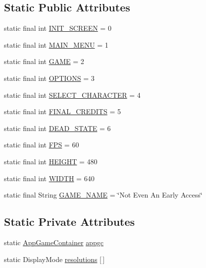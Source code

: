 \subsection*{Static Public Attributes}
\begin{DoxyCompactItemize}
\item 
static final int \mbox{\hyperlink{classstates_1_1_not_even_an_early_access_ac99102ff69eb50a2ab5e5179e9b0e051}{I\+N\+I\+T\+\_\+\+S\+C\+R\+E\+EN}} = 0
\item 
static final int \mbox{\hyperlink{classstates_1_1_not_even_an_early_access_a5d36ea9f3991d1e416da183a531c0f3f}{M\+A\+I\+N\+\_\+\+M\+E\+NU}} = 1
\item 
static final int \mbox{\hyperlink{classstates_1_1_not_even_an_early_access_ac1f4023cea8923ad519c090f6ba47274}{G\+A\+ME}} = 2
\item 
static final int \mbox{\hyperlink{classstates_1_1_not_even_an_early_access_a5e97a3d3df403c050fa07242e19fef32}{O\+P\+T\+I\+O\+NS}} = 3
\item 
static final int \mbox{\hyperlink{classstates_1_1_not_even_an_early_access_a2c58ac815b8ce14c073ede131fcb34a3}{S\+E\+L\+E\+C\+T\+\_\+\+C\+H\+A\+R\+A\+C\+T\+ER}} = 4
\item 
static final int \mbox{\hyperlink{classstates_1_1_not_even_an_early_access_a3d511633236063385f5be1a71d44934b}{F\+I\+N\+A\+L\+\_\+\+C\+R\+E\+D\+I\+TS}} = 5
\item 
static final int \mbox{\hyperlink{classstates_1_1_not_even_an_early_access_a2cee2d7dfd6a182fd0ea5225cf46db9b}{D\+E\+A\+D\+\_\+\+S\+T\+A\+TE}} = 6
\item 
static final int \mbox{\hyperlink{classstates_1_1_not_even_an_early_access_a053bb50551b79aeb28e26540e9042e54}{F\+PS}} = 60
\item 
static final int \mbox{\hyperlink{classstates_1_1_not_even_an_early_access_a75475d8ae8132183bf22878df23347f8}{H\+E\+I\+G\+HT}} = 480
\item 
static final int \mbox{\hyperlink{classstates_1_1_not_even_an_early_access_a5f8efd25115a491193be8b5b1b543036}{W\+I\+D\+TH}} = 640
\item 
static final String \mbox{\hyperlink{classstates_1_1_not_even_an_early_access_a4ca6cdcb2fdd87a44bb234689d86057a}{G\+A\+M\+E\+\_\+\+N\+A\+ME}} = \char`\"{}Not Even An Early Access\char`\"{}
\end{DoxyCompactItemize}
\subsection*{Static Private Attributes}
\begin{DoxyCompactItemize}
\item 
static \mbox{\hyperlink{classorg_1_1newdawn_1_1slick_1_1_app_game_container}{App\+Game\+Container}} \mbox{\hyperlink{classstates_1_1_not_even_an_early_access_a6dbb502cb4c878abfd65a496df8fdda7}{appgc}}
\item 
static Display\+Mode \mbox{\hyperlink{classstates_1_1_not_even_an_early_access_a6ec8bd68962b143c4b5f371ee0b97fc5}{resolutions}} \mbox{[}$\,$\mbox{]}
\end{DoxyCompactItemize}
